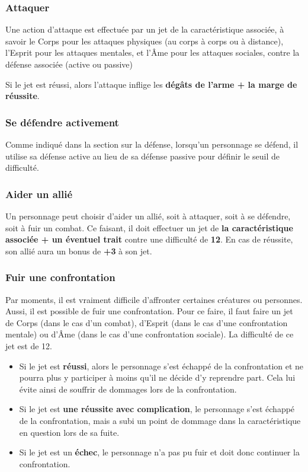 \documentclass[10pt,twoside,twocolumn,openany,bg=print,justified]{dndbook}
\begin{document}
\subsubsection*{Attaquer}

Une action d'attaque est effectuée par un jet de la caractéristique associée, à savoir le Corps pour les attaques physiques (au corps à corps ou à distance), l'Esprit pour les attaques mentales, et l'Âme pour les attaques sociales, contre la défense associée (active ou passive)

Si le jet est réussi, alors l'attaque inflige les \textbf{dégâts de l'arme + la marge de réussite}.

\subsubsection*{Se défendre activement}

Comme indiqué dans la section sur la défense, lorsqu'un personnage se défend, il utilise sa défense active au lieu de sa défense passive pour définir le seuil de difficulté.

\subsubsection*{Aider un allié}

Un personnage peut choisir d'aider un allié, soit à attaquer, soit à se défendre, soit à fuir un combat. Ce faisant, il doit effectuer un jet de \textbf{la caractéristique associée + un éventuel trait} contre une difficulté de \textbf{12}. En cas de réussite, son allié aura un bonus de \textbf{+3} à son jet.

\subsubsection*{Fuir une confrontation}

Par moments, il est vraiment difficile d'affronter certaines créatures ou personnes. Aussi, il est possible de fuir une confrontation. Pour ce faire, il faut faire un jet de Corps (dans le cas d'un combat), d'Esprit (dans le cas d'une confrontation mentale) ou d'Âme (dans le cas d'une confrontation sociale). La difficulté de ce jet est de 12.

\begin{itemize}
\item Si le jet est \textbf{réussi}, alors le personnage s'est échappé de la confrontation et ne pourra plus y participer à moins qu'il ne décide d'y reprendre part. Cela lui évite ainsi de souffrir de dommages lors de la confrontation.
\item Si le jet est \textbf{une réussite avec complication}, le personnage s'est échappé de la confrontation, mais a subi un point de dommage dans la caractéristique en question lors de sa fuite.
\item Si le jet est un \textbf{échec}, le personnage n'a pas pu fuir et doit donc continuer la confrontation.
\end{itemize}
\end{document}
